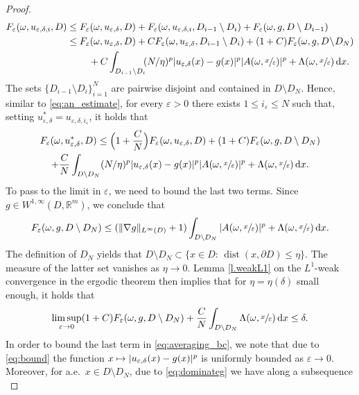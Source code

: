 \documentclass[JEP,XML,SOM,Unicode,published]{cedram}
\def\mto{\mathchoice{\longmapsto}{\mapsto}{\mapsto}{\mapsto}}
\theoremstyle{definition}
\let\e\varepsilon
\let\w\omega
\newcommand{\dx}{\,\mathrm{d}x}
\DeclareMathOperator{\dist}{dist}
\newcommand{\R}{\mathbb{R}}
\begin{document}
\begin{proof}
\begin{align*}
F_{\e}(\w,u_{\e,\delta,i},D)&\leq F_{\e}(\w,u_{\e,\delta},D)+F_{\e}(\w,u_{\e,\delta,i},D_{i-1}\setminus D_i)+F_{\e}(\w,g,D\setminus D_{i-1})
\\
&\leq F_{\e}(\w,u_{\e,\delta},D)+C F_{\e}(\w,u_{\e,\delta},D_{i-1}\setminus D_i)+(1+C)F_{\e}(\w,g,D\!\setminus\! D_N)
\\
&\hspace*{.8cm} +C\int_{D_{i-1}\setminus D_i}\hspace*{-1mm}(N/\eta)^p |u_{\e,\delta}(x)-g(x)|^p|A(\w,\sfrac{x}{\e})|^p+\Lambda(\w,\sfrac{x}{\e})\dx.
\end{align*}
The sets $\{D_{i-1}\setminus D_i\}_{i=1}^N$ are pairwise disjoint and contained in $D\setminus D_N$. Hence, similar to \eqref{eq:an_estimate}, for every $\e>0$ there exists $1\leq i_{\e}\leq N$ such that, setting $u^*_{\e,\delta}=u_{\e,\delta,i_{\e}}$, it holds that
\begin{multline}\label{eq:averaging_bc}
F_{\e}(\w,u_{\e,\delta}^*,D)\leq \Bigl(1+\frac{C}{N}\Bigr)F_{\e}(\w,u_{\e,\delta},D)+(1+C)F_{\e}(\w,g,D\setminus D_N)
\\
+\frac{C}{N}\int_{D\setminus D_N}(N/\eta)^p |u_{\e,\delta}(x)-g(x)|^p|A(\w,\sfrac{x}{\e})|^p+\Lambda(\w,\sfrac{x}{\e})\dx.
\end{multline}
To pass to the limit in $\e$, we need to bound the last two terms. Since $g\in W^{1,\infty}(D,\R^m)$, we conclude that
\begin{equation*}
F_{\e}(\w,g,D\setminus D_N)\leq (\|\nabla g\|_{L^{\infty}(D)}+1)\int_{D\setminus D_N}|A(\w,\sfrac{x}{\e})|^p+\Lambda(\w,\sfrac{x}{\e})\dx.
\end{equation*}
The definition of $D_N$ yields that $D\setminus D_N\subset \{x\in D:\,\dist(x,\partial D)\leq \eta\}$. The measure of the latter set vanishes as $\eta\to 0$. Lemma \ref{l.weakL1} on the $L^1$-weak convergence in the ergodic theorem then implies that for $\eta=\eta(\delta)$ small enough, it holds that
\begin{equation}\label{eq:control_g}
\limsup_{\e\to 0}(1+C)F_{\e}(\w,g,D\setminus D_N)+\frac{C}{N}\int_{D\setminus D_N}\Lambda(\w,\sfrac{x}{\e})\dx\leq\delta.
\end{equation}
In order to bound the last term in \eqref{eq:averaging_bc}, we note that due to \eqref{eq:bound} the function $x\mto |u_{\e,\delta}(x)-g(x)|^p$ is uniformly bounded as $\e\to 0$. Moreover, for a.e.\ $x\in D\setminus D_N$, due to \eqref{eq:dominateg} we have along a subsequence
\begin{equation*}

\end{equation*}
\end{proof}
\end{document}
